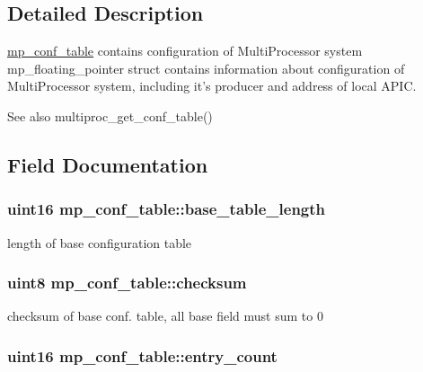 \subsection{Detailed Description}
\hyperlink{structmp__conf__table}{mp\_\-conf\_\-table} contains configuration of MultiProcessor system mp\_\-floating\_\-pointer struct contains information about configuration of MultiProcessor system, including it's producer and address of local APIC.

\begin{DoxySeeAlso}{See also}
multiproc\_\-get\_\-conf\_\-table() 
\end{DoxySeeAlso}


\subsection{Field Documentation}
\hypertarget{structmp__conf__table_a7d51594cda122bf1e17a46f858bec308}{
\subsubsection[{base\_\-table\_\-length}]{\setlength{\rightskip}{0pt plus 5cm}uint16 {\bf mp\_\-conf\_\-table::base\_\-table\_\-length}}}
\label{structmp__conf__table_a7d51594cda122bf1e17a46f858bec308}
length of base configuration table \hypertarget{structmp__conf__table_a12817b7e6d451aa2eb298cbd602013d6}{
\subsubsection[{checksum}]{\setlength{\rightskip}{0pt plus 5cm}uint8 {\bf mp\_\-conf\_\-table::checksum}}}
\label{structmp__conf__table_a12817b7e6d451aa2eb298cbd602013d6}
checksum of base conf. table, all base field must sum to 0 \hypertarget{structmp__conf__table_a89991590f1e56c3938c341e07682f5d3}{
\subsubsection[{entry\_\-count}]{\setlength{\rightskip}{0pt plus 5cm}uint16 {\bf mp\_\-conf\_\-table::entry\_\-count}}}
